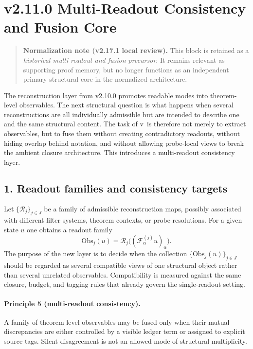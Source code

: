 \section*{v2.11.0 Multi-Readout Consistency and Fusion Core}

\begin{quote}
\textbf{Normalization note (v2.17.1 local review).}
This block is retained as a \emph{historical multi-readout and fusion precursor}. It remains relevant as supporting proof memory, but no longer functions as an independent primary structural core in the normalized architecture.
\end{quote}

The reconstruction layer from v2.10.0 promotes readable modes into theorem-level
observables. The next structural question is what happens when several
reconstructions are all individually admissible but are intended to describe one
and the same structural content. The task of v\docversion\ is therefore not merely
to extract observables, but to fuse them without creating contradictory readouts,
without hiding overlap behind notation, and without allowing probe-local views to
break the ambient closure architecture. This introduces a multi-readout
consistency layer.

\subsection*{1. Readout families and consistency targets}
Let $\{\mathcal R_j\}_{j\in J}$ be a family of admissible reconstruction maps,
possibly associated with different filter systems, theorem contexts, or probe
resolutions. For a given state $u$ one obtains a readout family
\[
\mathrm{Obs}_j(u)=\mathcal R_j\bigl((\mathcal F^{(j)}_\alpha u)_\alpha\bigr).
\]
The purpose of the new layer is to decide when the collection
$\{\mathrm{Obs}_j(u)\}_{j\in J}$ should be regarded as several compatible views of one
structural object rather than several unrelated observables. Compatibility is
measured against the same closure, budget, and tagging rules that already govern
the single-readout setting.

\paragraph{Principle 5 (multi-readout consistency).}
A family of theorem-level observables may be fused only when their mutual
discrepancies are either controlled by a visible ledger term or assigned to
explicit source tags. Silent disagreement is not an allowed mode of structural
multiplicity.

